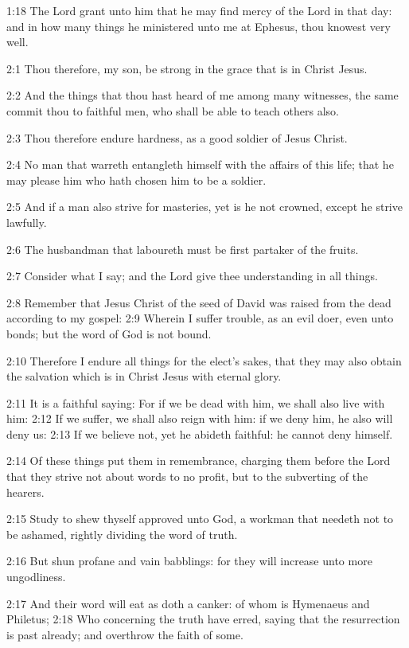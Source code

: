 1:18 The Lord grant unto him that he may find mercy of the Lord in that day: and in how many things he ministered unto me at Ephesus, thou knowest very well.

2:1 Thou therefore, my son, be strong in the grace that is in Christ Jesus.

2:2 And the things that thou hast heard of me among many witnesses, the same commit thou to faithful men, who shall be able to teach others also.

2:3 Thou therefore endure hardness, as a good soldier of Jesus Christ.

2:4 No man that warreth entangleth himself with the affairs of this life; that he may please him who hath chosen him to be a soldier.

2:5 And if a man also strive for masteries, yet is he not crowned, except he strive lawfully.

2:6 The husbandman that laboureth must be first partaker of the fruits.

2:7 Consider what I say; and the Lord give thee understanding in all things.

2:8 Remember that Jesus Christ of the seed of David was raised from the dead according to my gospel: 2:9 Wherein I suffer trouble, as an evil doer, even unto bonds; but the word of God is not bound.

2:10 Therefore I endure all things for the elect's sakes, that they may also obtain the salvation which is in Christ Jesus with eternal glory.

2:11 It is a faithful saying: For if we be dead with him, we shall also live with him: 2:12 If we suffer, we shall also reign with him: if we deny him, he also will deny us: 2:13 If we believe not, yet he abideth faithful: he cannot deny himself.

2:14 Of these things put them in remembrance, charging them before the Lord that they strive not about words to no profit, but to the subverting of the hearers.

2:15 Study to shew thyself approved unto God, a workman that needeth not to be ashamed, rightly dividing the word of truth.

2:16 But shun profane and vain babblings: for they will increase unto more ungodliness.

2:17 And their word will eat as doth a canker: of whom is Hymenaeus and Philetus; 2:18 Who concerning the truth have erred, saying that the resurrection is past already; and overthrow the faith of some.

